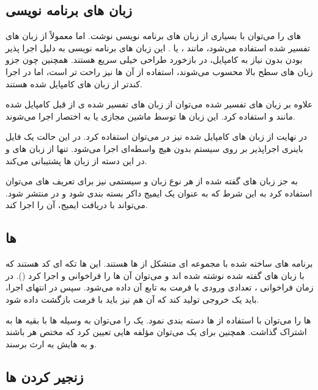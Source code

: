 \subsection{زبان های برنامه نویسی }

 های  را می‌توان با بسیاری از زبان های برنامه نویسی نوشت. اما معمولاً از زبان های تفسیر شده استفاده می‌شود، مانند ،  یا . این زبان های برنامه نویسی به دلیل اجرا پذیر بودن بدون نیاز به کامپایل، در بازخورد طراحی خیلی سریع هستند. همچنین چون جزو زبان های سطح بالا محسوب می‌شوند، استفاده از آن ها نیز راحت تر است، اما در اجرا کندتر از زبان های کامپایل شده هستند.

علاوه بر زبان های تفسیر شده می‌توان از زبان های تفسیر شده ی از قبل کامپایل شده مانند  و  استفاده کرد. این زبان ها توسط ماشین مجازی  یا به اختصار  اجرا می‌شوند.

در نهایت از زبان های کامپایل شده نیز در  می‌توان استفاده کرد. در این حالت یک فایل باینری اجراپذیر بر روی سیستم بدون هیچ واسطه‌ای اجرا می‌شود.  تنها از زبان های  و  در این دسته از زبان ها پشتیبانی می‌کند.

به جز زبان های گفته شده از هر نوع زبان و سیستمی نیز برای تعریف  های  می‌توان استفاده کرد به این شرط که به عنوان یک ایمیج داکر بسته بندی شود و در  منتشر شود.  می‌تواند با دریافت ایمیج، آن را اجرا کند.

\subsection{ ها}

برنامه های ساخته شده با  مجموعه ای متشکل از  ها هستند. این  ها تکه ای کد هستند که با زبان های گفته شده نوشته شده اند و می‌توان آن ها را فراخوانی و اجرا کرد (). در زمان فراخوانی ، تعدادی ورودی با فرمت  به تابع آن داده می‌شود. سپس در انتهای اجرا،  باید یک خروجی تولید کند که آن هم نیز باید با فرمت  بازگشت داده شود.

 ها را می‌توان با استفاده از  ها دسته بندی نمود. یک  را می‌توان به وسیله  ها با بقیه  ها به اشتراک گذاشت. همچنین برای یک  می‌توان مؤلفه هایی تعیین کرد که مختص هر  باشند و به  هایش به ارث برسند.

\subsection{زنجیر کردن  ها}

